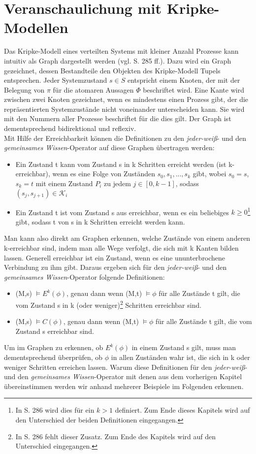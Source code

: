 \section{Veranschaulichung mit Kripke-Modellen}
\label{Kripke-Modelle}
Das Kripke-Modell eines verteilten Systems mit kleiner Anzahl Prozesse kann intuitiv als Graph dargestellt werden (vgl. \cite{kshemkalyani2011distributed} S. 285 ff.).
Dazu wird ein Graph gezeichnet, dessen Bestandteile den Objekten des Kripke-Modell Tupels entsprechen.
Jeder Systemzustand $s\in S$ entspricht einem Knoten, der mit der Belegung von $\pi$ für die atomaren Aussagen $\Phi$ beschriftet wird. Eine Kante wird zwischen zwei Knoten gezeichnet, wenn es mindestens einen Prozess gibt, der die repräsentierten Systemzustände nicht voneinander unterscheiden kann. Sie wird mit den Nummern aller Prozesse beschriftet für die dies gilt.
Der Graph ist dementsprechend bidirektional und reflexiv.\\
Mit Hilfe der Erreichbarkeit können die Definitionen zu den \textit{jeder-weiß}- und den \textit{gemeinsames Wissen}-Operator auf diese Graphen übertragen werden:
\begin{itemize}
	\item Ein Zustand t kann vom Zustand s in k Schritten erreicht werden (ist k-erreichbar), wenn es eine Folge von Zuständen $s_0,s_1,...,s_k$ gibt, wobei $s_0 = s$, $s_k = t$ mit einem Zustand $P_i$ zu jedem $j\in [ 0,k-1 ]$, sodass $(s_j,s_{j+1})\in \mathcal{K}_i$
	\item Ein Zustand t ist vom Zustand s aus erreichbar, wenn es ein beliebiges $k \ge 0$\footnote{\label{note1}In \cite{kshemkalyani2011distributed} S. 286 wird dies für ein $k > 1$ definiert. Zum Ende dieses Kapitels wird auf den Unterschied der beiden Definitionen eingegangen.} gibt, sodass t von s in k Schritten erreicht werden kann.
\end{itemize}
Man kann also direkt am Graphen erkennen, welche Zustände von einem anderen k-erreichbar sind, indem man alle Wege verfolgt, die sich mit k Kanten bilden lassen.
Generell erreichbar ist ein Zustand, wenn es eine ununterbrochene Verbindung zu ihm gibt.
Daraus ergeben sich für den \textit{jeder-weiß}- und den \textit{gemeinsames Wissen}-Operator folgende Definitionen:
\begin{itemize}
	\item (M,s) $\vDash E^{k}(\phi)$, genau dann wenn (M,t) $\vDash \phi$ für alle Zustände t gilt, die vom Zustand s in k (oder weniger)\footnote{\label{note2}In \cite{kshemkalyani2011distributed} S. 286 fehlt dieser Zusatz. Zum Ende des Kapitels wird auf den Unterschied eingegangen.} Schritten erreichbar sind.
	\item (M,s) $\vDash C(\phi)$, genau dann wenn (M,t) $\vDash \phi$ für alle Zustände t gilt, die vom Zustand s erreichbar sind.
\end{itemize}
Um im Graphen zu erkennen, ob $E^{k}(\phi)$ in einem Zustand s gilt, muss man dementsprechend überprüfen, ob $\phi$ in allen Zuständen wahr ist, die sich in k oder weniger Schritten erreichen lassen. 
Warum diese Definitionen für den \textit{jeder-weiß}- und den \textit{gemeinsames Wissen}-Operator mit denen aus dem vorherigen Kapitel übereinstimmen werden wir anhand mehrerer Beispiele im Folgenden erkennen.

